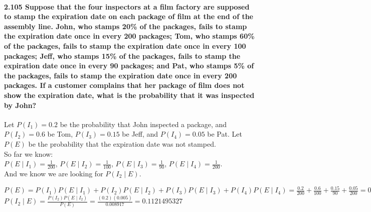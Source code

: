 \documentclass{article}
\begin{document}
\pagebreak

\paragraph{2.105 Suppose that the four inspectors at a film factory are supposed to stamp 
the expiration date on each package of film at the end of the assembly line. John, who 
stamps 20\% of the packages, fails to stamp the expiration date once in every 200 
packages; Tom, who stamps 60\% of the packages, fails to stamp the expiration date once 
in every 100 packages; Jeff, who stamps 15\% of the packages, fails to stamp the expiration 
date once in every 90 packages; and Pat, who stamps 5\% of the packages, fails to stamp 
the expiration date once in every 200 packages. If a customer complains that her package 
of film does not show the expiration date, what is the probability that it was inspected by 
John?\\}
Let $P(I_1) = 0.2$ be the probability that John inspected a package, and $P(I_2) = 0.6$ be 
Tom, $P(I_3) = 0.15$ be Jeff, and $P(I_4) = 0.05$ be Pat.
Let $P(E)$ be the probability that the expiration date was not stamped.\\
So far we know:\\
$P(E \mid I_1) = \frac{1}{200}$, $P(E \mid I_2) = \frac{1}{100}$, 
$P(E \mid I_3) = \frac{1}{90}$, $P(E \mid I_4) = \frac{1}{200}$.\\
And we know we are looking for $P(I_2 \mid E)$.
\begin{center}
$P(E) = P(I_1)P(E \mid I_1) + P(I_2)P(E \mid I_2) + P(I_3)P(E \mid I_3) + P(I_4)P(E \mid I_4) = 
\frac{0.2}{200} + \frac{0.6}{100} + \frac{0.15}{90} + \frac{0.05}{200} = 0.008917$\\
$\boxed{P(I_2 \mid E) = \frac{P(I_2)P(E \mid I_2)}{P(E)} = \frac{(0.2)(0.005)}{0.008917} = 
0.1121495327}$
\end{center}
\end{document}
